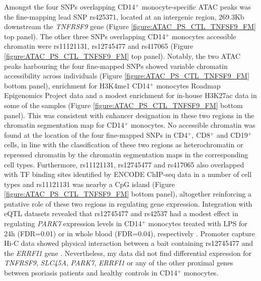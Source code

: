 Amongst the four SNPs overlapping CD14$^+$ monocyte-specific ATAC peaks was the fine-mapping lead SNP rs425371, located at an intergenic region, 269.3Kb downstream the \textit{TNFRSF9} gene (Figure \ref{figure:ATAC_PS_CTL_TNFSF9_FM} top panel). The other three SNPs overlapping CD14$^+$ monocytes accessible chromatin were rs11121131, rs12745477 and rs417065 (Figure \ref{figure:ATAC_PS_CTL_TNFSF9_FM} top panel). Notably, the two ATAC peaks harbouring the four fine-mapped SNPs showed variable chromatin accessibility across individuals (Figure \ref{figure:ATAC_PS_CTL_TNFSF9_FM} bottom panel), enrichment for H3K4me1 CD14$^+$ monocytes Roadmap Epigenomics Project data and a modest enrichment for in-house H3K27ac data in some of the samples (Figure \ref{figure:ATAC_PS_CTL_TNFSF9_FM} bottom panel). This was consistent with enhancer designation in these two regions in the chromatin segmentation map for CD14$^+$ monocytes. No accessible chromatin was found at the location of the four fine-mapped SNPs in CD4$^+$, CD8$^+$ and CD19$^+$ cells, in line with the classification of these two regions as heterochromatin or repressed chromatin by the chromatin segmentation maps in the corresponding cell types. Furthermore, rs11121131, rs12745477 and rs417065 also overlapped with TF binding sites identified by ENCODE ChIP-seq data in a number of cell types and rs11121131 was nearby a CpG island (Figure \ref{figure:ATAC_PS_CTL_TNFSF9_FM} bottom panel), altogether reinforcing a putative role of these two regions in regulating gene expression. Integration with eQTL datasets revealed that rs12745477 and rs42537 had a modest effect in regulating \textit{PARK7} expression levels in CD14$^+$ monocytes treated with LPS for 24h (FDR=0.01) or in whole blood (FDR=0.04), respectively \parencite{Fairfax2012,Westra2013}. Promoter capture Hi-C data showed physical interaction between a bait containing rs12745477 and the \textit{ERRFI1} gene \parencite{Javierre2016}. Nevertheless, my data did not find differential expression for \textit{TNFRSF9}, \textit{SLC45A}, \textit{PARK7}, \textit{ERRFI1} or any of the other proximal genes between psoriasis patients and healthy controls in CD14$^+$ monocytes.


